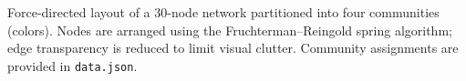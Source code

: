 \caption{Force-directed layout of a 30-node network partitioned into four communities (colors). Nodes are arranged using the Fruchterman--Reingold spring algorithm; edge transparency is reduced to limit visual clutter. Community assignments are provided in \texttt{data.json}.}
